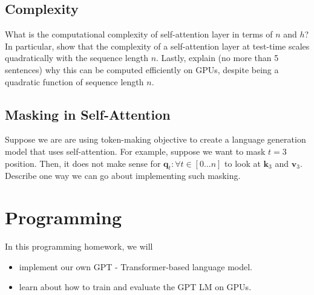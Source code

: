 \subsection{Complexity}
    What is the computational complexity of self-attention layer in terms of $n$ and $h$? 
    In particular, show that the complexity of a self-attention layer at test-time scales quadratically with the sequence length $n$. Lastly, explain (no more than 5 sentences) why this can be computed efficiently on GPUs, despite being a quadratic function of sequence length $n$.\\



\subsection{Masking in Self-Attention}
Suppose we are are using token-making objective to create a language generation model that uses self-attention. 
For example, suppose we want to mask $t=3$ position. 
Then, it does not make sense for $\textbf{q}_t: \forall t \in [0 \dots n]$  to look at $\textbf{k}_3$ and $\textbf{v}_3$. 
Describe one way we can go about implementing such masking. \\



\newpage

\section{Programming}
In this programming homework, we will
\begin{itemize}
    \item implement our own GPT - Transformer-based language model.
    \item learn about how to train and evaluate the GPT LM on GPUs.
\end{itemize}

